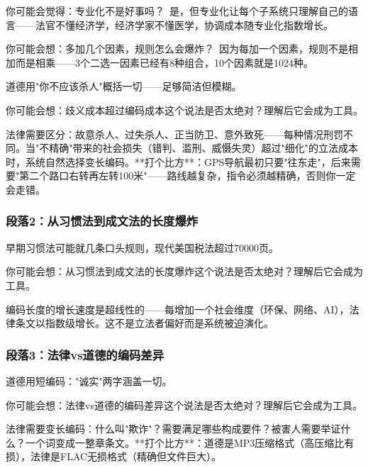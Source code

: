 \documentclass[a4paper,12pt]{book}
\newenvironment{motivation}{\begin{tcolorbox}[colback=gray!10,colframe=gray!60,title=\textit{本章动机},fonttitle=\bfseries,arc=0mm,leftrule=3mm]\small\itshape}{\end{tcolorbox}}
\begin{document}
\begin{motivation}
\begin{motivation}
\begin{motivation}
	\begin{tcolorbox}[colback=yellow!5, title=\textit{读者行为预测}]
		你可能会觉得：专业化不是好事吗？\ 是，但专业化让每个子系统只理解自己的语言——法官不懂经济学，经济学家不懂医学，协调成本随专业化指数增长。
	\end{tcolorbox}


	\begin{tcolorbox}[colback=yellow!5, title=\textit{读者行为预测}]
		你可能会想：多加几个因素，规则怎么会爆炸？\ 因为每加一个因素，规则不是相加而是相乘——3个二选一因素已经有8种组合，10个因素就是1024种。
	\end{tcolorbox}

	道德用"你不应该杀人"概括一切——足够简洁但模糊。
	\begin{tcolorbox}[colback=yellow!5, title=\textit{读者行为预测}]
		你可能会想：歧义成本超过编码成本这个说法是否太绝对？理解后它会成为工具。
	\end{tcolorbox}

法律需要区分：故意杀人、过失杀人、正当防卫、意外致死——每种情况刑罚不同。当"不精确"带来的社会损失（错判、滥刑、威慑失灵）超过"细化"的立法成本时，系统自然选择变长编码。**打个比方**：GPS导航最初只要"往东走"，后来需要"第二个路口右转再左转100米"——路线越复杂，指令必须越精确，否则你一定会走错。

	\subsubsection*{段落2：从习惯法到成文法的长度爆炸}
	早期习惯法可能就几条口头规则，现代美国税法超过70000页。
	\begin{tcolorbox}[colback=yellow!5, title=\textit{读者行为预测}]
		你可能会想：从习惯法到成文法的长度爆炸这个说法是否太绝对？理解后它会成为工具。
	\end{tcolorbox}

编码长度的增长速度是超线性的——每增加一个社会维度（环保、网络、AI），法律条文以指数级增长。这不是立法者偏好而是系统被迫演化。

	\subsubsection*{段落3：法律vs道德的编码差异}
	道德用短编码："诚实"两字涵盖一切。
	\begin{tcolorbox}[colback=yellow!5, title=\textit{读者行为预测}]
		你可能会想：法律vs道德的编码差异这个说法是否太绝对？理解后它会成为工具。
	\end{tcolorbox}

法律需要变长编码：什么叫"欺诈"？需要满足哪些构成要件？被害人需要举证什么？一个词变成一整章条文。**打个比方**：道德是MP3压缩格式（高压缩比有损），法律是FLAC无损格式（精确但文件巨大）。


\end{motivation}
\end{motivation}
\end{motivation}
\end{document}
